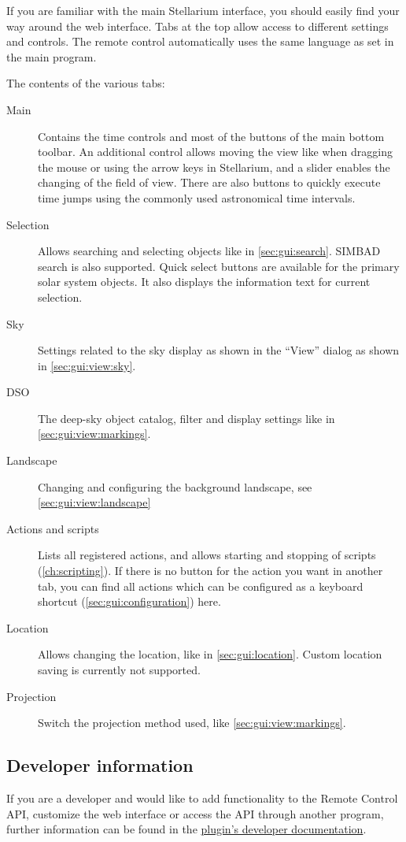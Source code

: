 If you are familiar with the main Stellarium interface, you should easily find 
your way around the web interface. Tabs at the top allow access to 
different settings and controls. The remote control automatically uses the 
same language as set in the main program.

The contents of the various tabs:
\begin{description}
\item[Main] Contains the time controls and most of the buttons of the 
main bottom toolbar. An additional control allows moving the view like when 
dragging the mouse or using the arrow keys in Stellarium, and a slider enables 
the changing of the field of view. There are also buttons to quickly execute 
time jumps using the commonly used astronomical time intervals.
\item[Selection] Allows searching and selecting objects like in \autoref{sec:gui:search}. 
SIMBAD search is also supported. Quick select buttons are available for the 
primary solar system objects. It also displays the information text for current 
selection.
\item[Sky] Settings related to the sky display as shown in the ``View'' dialog 
as shown in \autoref{sec:gui:view:sky}.
\item[DSO] The deep-sky object catalog, filter and display settings like in 
\autoref{sec:gui:view:markings}.
\item[Landscape] Changing and configuring the background landscape, see 
\autoref{sec:gui:view:landscape}
\item[Actions and scripts] Lists all registered actions, and allows starting 
and stopping of scripts (\autoref{ch:scripting}). If there is no button for the 
action you want in another tab, you can find all actions which can be 
configured as a keyboard shortcut (\autoref{sec:gui:configuration}) here.
\item[Location] Allows changing the location, like in 
\autoref{sec:gui:location}. Custom location saving is currently not 
supported.
\item[Projection] Switch the projection method used, like \autoref{sec:gui:view:markings}.
\end{description}

\subsection{Developer information}
\label{sec:plugins:RemoteControl:developer}

If you are a developer and would like to add functionality to the Remote 
Control API, customize the web interface or access the API through another 
program, further information can be found in the 
\href{http://stellarium.org/doc-plugins/head/}{plugin's developer 
documentation}.


